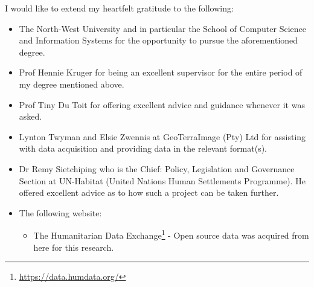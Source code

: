 \documentclass[
12pt, %
english, %
doublespacing, %
headsepline, %
]{MastersDoctoralThesis} %
\begin{document}
\begin{acknowledgements}
\addchaptertocentry{\acknowledgementname}
I would like to extend my heartfelt gratitude to the following:
\begin{itemize}
\item The North-West University and in particular the School of Computer Science and Information Systems for the opportunity to pursue the aforementioned degree.
\item Prof Hennie Kruger for being an excellent supervisor for the entire period of my degree mentioned above.
\item Prof Tiny Du Toit for offering excellent advice and guidance whenever it was asked.
\item Lynton Twyman and Elsie Zwennis at GeoTerraImage (Pty) Ltd for assisting with data acquisition and providing data in the relevant format(s).
\item Dr Remy Sietchiping who is the Chief: Policy, Legislation and Governance Section at UN-Habitat (United Nations Human Settlements Programme). He offered excellent advice as to how such a project can be taken further.
\item The following website:
\begin{itemize}
\item The Humanitarian Data Exchange\footnote{\url{https://data.humdata.org/}} - Open source data was acquired from here for this research.
\end{itemize}
\end{itemize}
\end{acknowledgements}


\tableofcontents %

\listoffigures %

\listoftables %

\end{document}

